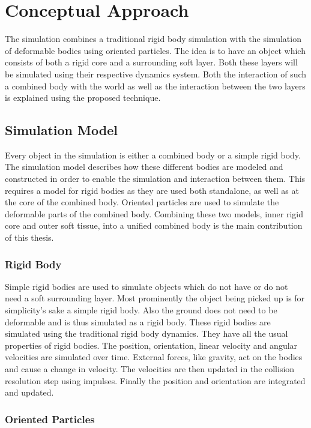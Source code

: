 \chapter{Conceptual Approach}
\label{cha:conceptual_approach}

The simulation combines a traditional rigid body simulation with the simulation of deformable bodies using oriented particles. The idea is to have an object which consists of both a rigid core and a surrounding soft layer. Both these layers will be simulated using their respective dynamics system. Both the interaction of such a combined body with the world as well as the interaction between the two layers is explained using the proposed technique.

\section{Simulation Model}
\label{sec:simulation_model}

Every object in the simulation is either a combined body or a simple rigid body. The simulation model describes how these different bodies are modeled and constructed in order to enable the simulation and interaction between them. This requires a model for rigid bodies as they are used both standalone, as well as at the core of the combined body. Oriented particles are used to simulate the deformable parts of the combined body. Combining these two models, inner rigid core and outer soft tissue, into a unified combined body is the main contribution of this thesis.
\subsection{Rigid Body}

Simple rigid bodies are used to simulate objects which do not have or do not need a soft surrounding layer. Most prominently the object being picked up is for simplicity's sake a simple rigid body. Also the ground does not need to be deformable and is thus simulated as a rigid body. These rigid bodies are simulated using the traditional rigid body dynamics. They have all the usual properties of rigid bodies. The position, orientation, linear velocity and angular velocities are simulated over time. External forces, like gravity, act on the bodies and cause a change in velocity. The velocities are then updated in the collision resolution step using impulses. Finally the position and orientation are integrated and updated.

\subsection{Oriented Particles}

